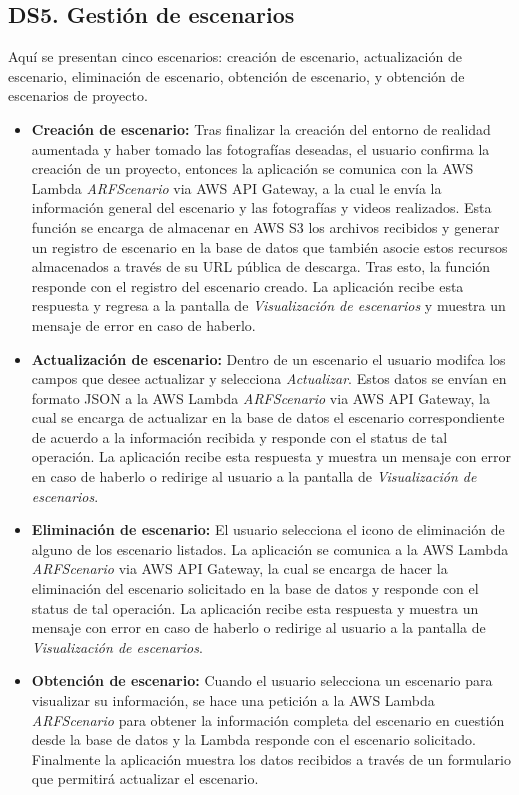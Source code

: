 \subsection{DS5. Gestión de escenarios}
Aquí se presentan cinco escenarios: creación de escenario, actualización de escenario, eliminación de escenario, obtención de escenario, y obtención de escenarios de proyecto.
\begin{itemize}
	\item \textbf{Creación de escenario:} Tras finalizar la creación del entorno de realidad aumentada y haber tomado las fotografías deseadas, el usuario confirma la creación de un proyecto, entonces la aplicación se comunica con la AWS Lambda \textit{ARFScenario} via AWS API Gateway, a la cual le envía la información general del escenario y las fotografías y videos realizados. Esta función se encarga de almacenar en AWS S3 los archivos recibidos y generar un registro de escenario en la base de datos que también asocie estos recursos almacenados a través de su URL pública de descarga. Tras esto, la función responde con el registro del escenario creado. La aplicación recibe esta respuesta y regresa a la pantalla de \textit{Visualización de escenarios} y muestra un mensaje de error en caso de haberlo.
	\item \textbf{Actualización de escenario: } Dentro de un escenario el usuario modifca los campos que desee actualizar y selecciona \textit{Actualizar}. Estos datos se envían en formato JSON a la AWS Lambda \textit{ARFScenario} via AWS API Gateway, la cual se encarga de actualizar en la base de datos el escenario correspondiente de acuerdo a la información recibida y responde con el status de tal operación. La aplicación recibe esta respuesta y muestra un mensaje con error en caso de haberlo o redirige al usuario a la pantalla de \textit{Visualización de escenarios}.
	\item \textbf{Eliminación de escenario:} El usuario selecciona el icono de eliminación de alguno de los escenario listados. La aplicación se comunica a la AWS Lambda \textit{ARFScenario} via AWS API Gateway, la cual se encarga de hacer la eliminación del escenario solicitado en la base de datos y responde con el status de tal operación. La aplicación recibe esta respuesta y muestra un mensaje con error en caso de haberlo o redirige al usuario a la pantalla de \textit{Visualización de escenarios}.
	\item \textbf{Obtención de escenario:} Cuando el usuario selecciona un escenario para visualizar su información, se hace una petición a la AWS Lambda \textit{ARFScenario} para obtener la información completa del escenario en cuestión desde la base de datos y la Lambda responde con el escenario solicitado. Finalmente la aplicación muestra los datos recibidos a través de un formulario que permitirá actualizar el escenario.

\end{itemize}
